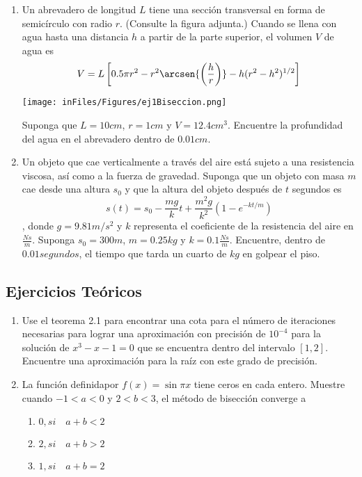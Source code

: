 \documentclass[12pt]{article}
\begin{document}
\begin{enumerate}
    \item Un abrevadero de longitud \(L\) tiene una sección transversal en forma de semicírculo con radio \(r\). (Consulte la
    figura adjunta.) Cuando se llena con agua hasta una distancia \(h\) a partir de la parte superior, el volumen \(V\) de
    agua es
    \[V = L \left[ 0.5\pi r^{2} - r^{2}\arcsen{\left( \frac{h}{r} \right)} - h(r^{2} - h^{2})^{1/2} \right]\]
    \begin{center}
        \texttt{[image: inFiles/Figures/ej1Biseccion.png]} 
    \end{center}

    Suponga que \(L = 10 cm\), \(r = 1 cm \) y \(V = 12.4 cm^{3}\). Encuentre la profundidad del agua en el abrevadero dentro de \(0.01 cm\).

    \item Un objeto que cae verticalmente a través del aire está sujeto a una resistencia viscosa, así como a la fuerza
    de gravedad. Suponga que un objeto con masa \(m\) cae desde una altura \(s_0\) y que la altura del objeto después
    de \(t\) segundos es
    \[s(t) = s_0 - \frac{mg}{k}t + \frac{m^{2}g}{k^{2}} \left( 1- e^{-kt/m}\right)\],
    donde \(g = 9.81 m/s^{2}\) y \(k\) representa el coeficiente de la resistencia del aire en \(\frac{Ns}{m}\). Suponga \(s_0 = 300m\),
    \(m = 0.25 kg\) y \(k = 0.1 \frac{Ns}{m}\). Encuentre, dentro de \(0.01 segundos\), el tiempo que tarda un cuarto de \(kg\) en golpear el piso. 
\end{enumerate}

\subsection*{Ejercicios Teóricos}

\begin{enumerate}       
    \item Use el teorema 2.1 para encontrar una cota para el número de iteraciones necesarias para lograr una
    aproximación con precisión de \(10^{-4}\) para la solución de \(x^{3} -x -1 = 0\) que se encuentra dentro del intervalo
    \([1, 2]\). Encuentre una aproximación para la raíz con este grado de precisión.

    \item La función definidapor \(f(x) = \sin{\pi} x\) tiene ceros en cada entero. Muestre cuando \(-1 < a< 0\) y \(2 < b< 3\),
    el método de bisección converge a

    \begin{enumerate}[label=\alph*.]
        \item \(0, si \quad a+b<2\)
        \item \(2, si \quad a+b>2\)
        \item \(1, si \quad a+b=2\)
    \end{enumerate}
\end{enumerate}     
\end{document}
